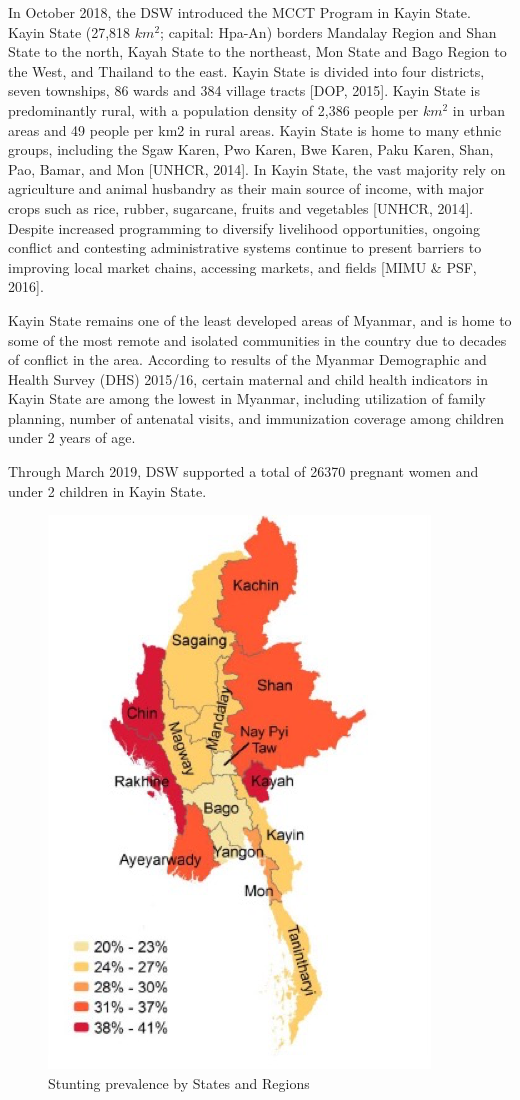 \documentclass[12pt,a4paper]{article}
\begin{document}
In October 2018, the DSW introduced the MCCT Program in Kayin State. Kayin State (27,818 \(km ^ 2\); capital: Hpa-An) borders Mandalay Region and Shan State to the north, Kayah State to the northeast, Mon State and Bago Region to the West, and Thailand to the east. Kayin State is divided into four districts, seven townships, 86 wards and 384 village tracts {[}DOP, 2015{]}. Kayin State is predominantly rural, with a population density of 2,386 people per \(km ^ 2\) in urban areas and 49 people per km2 in rural areas. Kayin State is home to many ethnic groups, including the Sgaw Karen, Pwo Karen, Bwe Karen, Paku Karen, Shan, Pao, Bamar, and Mon {[}UNHCR, 2014{]}. In Kayin State, the vast majority rely on agriculture and animal husbandry as their main source of income, with major crops such as rice, rubber, sugarcane, fruits and vegetables {[}UNHCR, 2014{]}. Despite increased programming to diversify livelihood opportunities, ongoing conflict and contesting administrative systems continue to present barriers to improving local market chains, accessing markets, and fields {[}MIMU \& PSF, 2016{]}.

Kayin State remains one of the least developed areas of Myanmar, and is home to some of the most remote and isolated communities in the country due to decades of conflict in the area. According to results of the Myanmar Demographic and Health Survey (DHS) 2015/16, certain maternal and child health indicators in Kayin State are among the lowest in Myanmar, including utilization of family planning, number of antenatal visits, and immunization coverage among children under 2 years of age.

Through March 2019, DSW supported a total of 26370 pregnant women and under 2 children in Kayin State.

\newpage

\begin{figure}[H]

{\centering \includegraphics[width=0.5\linewidth]{figures/kayah1} 

}

\caption{Stunting prevalence by States and Regions}\label{fig:myanmarMap1}
\end{figure}
\end{document}

